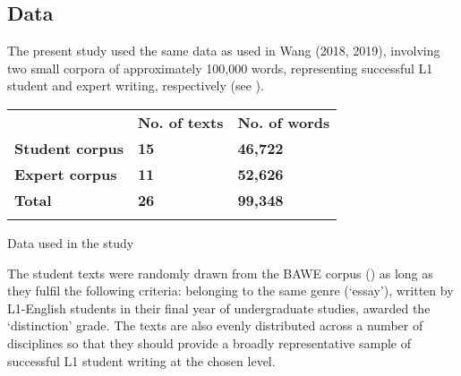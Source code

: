 \documentclass[output=paper]{langsci/langscibook}
\begin{document}
\subsection{Data}

The present study used the same data as used in Wang (2018, 2019), involving two small corpora of approximately 100,000 words, representing successful L1 student and expert writing, respectively (see ). 


\begin{tabularx}{\textwidth}{XXX} & {\bfseries No. of texts} & {\bfseries No. of words}\\

\lsptoprule
{\bfseries Student corpus} & {\bfseries \textmd{15}} & {\bfseries \textmd{46,722}}\\
{\bfseries Expert corpus} & {\bfseries \textmd{11}} & {\bfseries \textmd{52,626}}\\
{\bfseries Total} & {\bfseries \textmd{26}} & {\bfseries \textmd{99,348}}\\
\lspbottomrule
\end{tabularx}
\begin{table}
\caption{Data used in the study}
\label{tab:key:1}
\end{table}

The student texts were randomly drawn from the BAWE corpus (\citealt{NesiGardner2012}) as long as they fulfil the following criteria: belonging to the same genre (‘essay’), written by L1-English students in their final year of undergraduate studies, awarded the ‘distinction’ grade. The texts are also evenly distributed across a number of disciplines so that they should provide a broadly representative sample of successful L1 student writing at the chosen level. 
\end{document}
